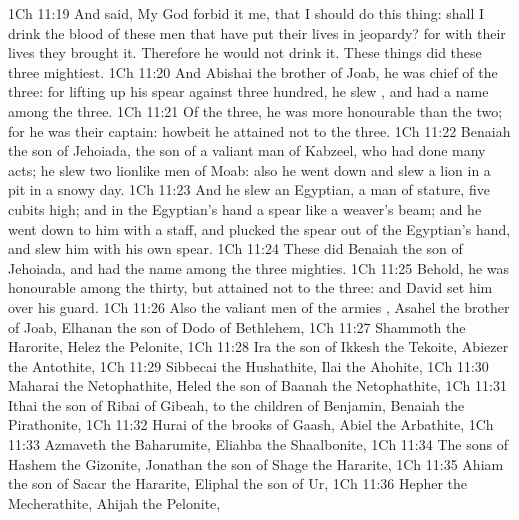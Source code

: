 \vs 1Ch 11:19 And said, My God forbid it me, that I should do this thing: shall I drink the blood of these men that have put their lives in jeopardy? for with  their lives they brought it. Therefore he would not drink it. These things did these three mightiest.
\vs 1Ch 11:20 And Abishai the brother of Joab, he was chief of the three: for lifting up his spear against three hundred, he slew , and had a name among the three.
\vs 1Ch 11:21 Of the three, he was more honourable than the two; for he was their captain: howbeit he attained not to the  three.
\vs 1Ch 11:22 Benaiah the son of Jehoiada, the son of a valiant man of Kabzeel, who had done many acts; he slew two lionlike men of Moab: also he went down and slew a lion in a pit in a snowy day.
\vs 1Ch 11:23 And he slew an Egyptian, a man of  stature, five cubits high; and in the Egyptian's hand  a spear like a weaver's beam; and he went down to him with a staff, and plucked the spear out of the Egyptian's hand, and slew him with his own spear.
\vs 1Ch 11:24 These  did Benaiah the son of Jehoiada, and had the name among the three mighties.
\vs 1Ch 11:25 Behold, he was honourable among the thirty, but attained not to the  three: and David set him over his guard.
\vs 1Ch 11:26 Also the valiant men of the armies , Asahel the brother of Joab, Elhanan the son of Dodo of Bethlehem,
\vs 1Ch 11:27 Shammoth the Harorite, Helez the Pelonite,
\vs 1Ch 11:28 Ira the son of Ikkesh the Tekoite, Abiezer the Antothite,
\vs 1Ch 11:29 Sibbecai the Hushathite, Ilai the Ahohite,
\vs 1Ch 11:30 Maharai the Netophathite, Heled the son of Baanah the Netophathite,
\vs 1Ch 11:31 Ithai the son of Ribai of Gibeah,  to the children of Benjamin, Benaiah the Pirathonite,
\vs 1Ch 11:32 Hurai of the brooks of Gaash, Abiel the Arbathite,
\vs 1Ch 11:33 Azmaveth the Baharumite, Eliahba the Shaalbonite,
\vs 1Ch 11:34 The sons of Hashem the Gizonite, Jonathan the son of Shage the Hararite,
\vs 1Ch 11:35 Ahiam the son of Sacar the Hararite, Eliphal the son of Ur,
\vs 1Ch 11:36 Hepher the Mecherathite, Ahijah the Pelonite,
